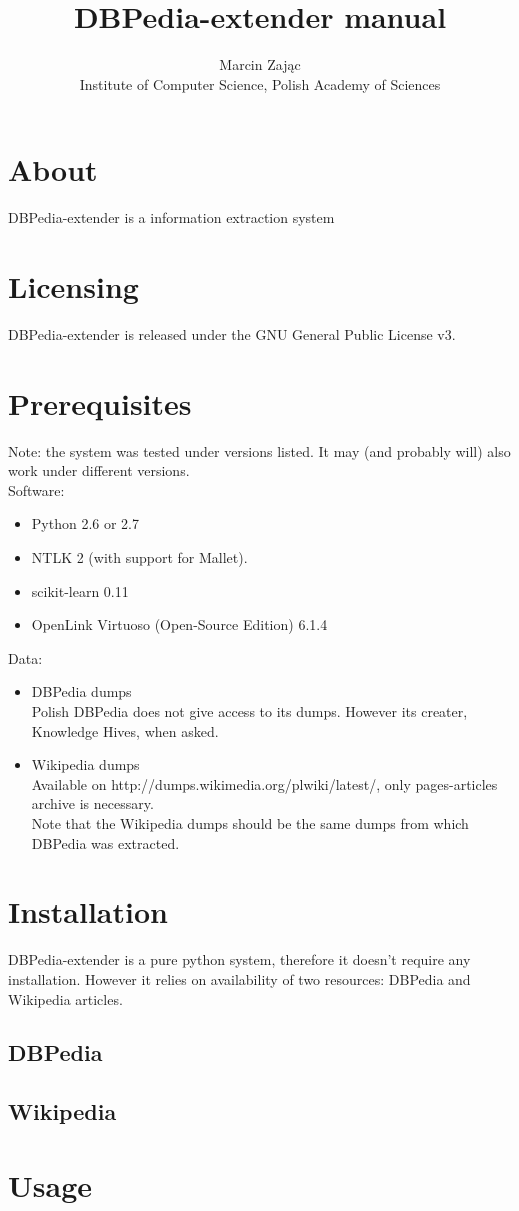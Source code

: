 \documentclass[12pt]{article}
\author{Marcin Zając\\Institute of Computer Science, Polish Academy of Sciences}
\title{DBPedia-extender manual}
\begin{document}
    \maketitle
    \section{About}
    DBPedia-extender is a information extraction system 
    
    \section{Licensing}
    DBPedia-extender is released under the GNU General Public License v3.

    \section{Prerequisites}
    Note: the system was tested under versions listed. It may (and probably will) also work under different versions.\\
    Software:
    \begin{itemize}
        \item Python 2.6 or 2.7
        \item NTLK 2 (with support for Mallet).
        \item scikit-learn 0.11
        \item OpenLink Virtuoso (Open-Source Edition) 6.1.4
    \end{itemize}
    Data:
    \begin{itemize}
        \item DBPedia dumps\\
            Polish DBPedia does not give access to its dumps.
            However its creater, Knowledge Hives, when asked.
        \item Wikipedia dumps\\
            Available on http://dumps.wikimedia.org/plwiki/latest/, only pages-articles archive is necessary.\\
            Note that the Wikipedia dumps should be the same dumps from which DBPedia was extracted.
    \end{itemize}
    
    \section{Installation}
    DBPedia-extender is a pure python system, therefore it doesn't require any installation.
    However it relies on availability of two resources: DBPedia and Wikipedia articles.
    \subsection{DBPedia}
    
    \subsection{Wikipedia}
    
    
    \section{Usage}
    
    
\end{document}
